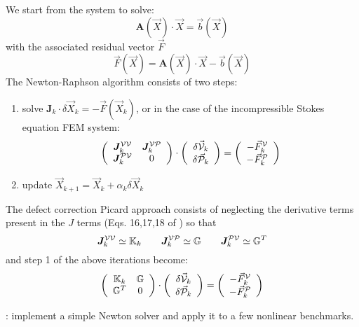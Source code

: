 We start from the system to solve:
\[
{\bm A}(\vec X) \cdot \vec X = \vec b(\vec X)
\]
with the associated residual vector $\vec F$ 
\[
\vec F(\vec X) = {\bm A}(\vec X) \cdot \vec X - \vec b(\vec X)
\]
The Newton-Raphson algorithm consists of two steps:
\begin{enumerate}
\item solve $\bm J_k \cdot \delta \vec X_k = -\vec F(\vec X_k)$, or in the 
case of the incompressible Stokes equation FEM system:
\[
\left(
\begin{array}{cc}
\bm J^{{\cal V}{\cal V}}_k & \bm J^{{\cal V}{\cal P}}_k \\
\bm J^{{\cal P}{\cal V}}_k & 0
\end{array}
\right)
\cdot
\left(
\begin{array}{c}
\delta \vec {\cal V}_k \\ \delta \vec {\cal P}_k
\end{array}
\right)
=
\left(
\begin{array}{c}
- \vec F_k^{\cal V} \\ -\vec F_k^{\cal P}
\end{array}
\right)
\]

\item update $\vec X_{k+1} = \vec X_k + \alpha_k \delta \vec X_k$
\end{enumerate}
The defect correction Picard approach consists of neglecting the derivative terms present 
in the $J$ terms (Eqs. 16,17,18 of \cite{frbt19}) so that 
\[
\bm J^{{\cal V}{\cal V}}_k \simeq {\mathbb{K}}_k 
\quad\quad
\bm J^{{\cal V}{\cal P}}_k \simeq {\mathbb{G}} 
\quad\quad
\bm J^{{\cal P}{\cal V}}_k \simeq {\mathbb{G}}^T
\]
and step 1 of the above iterations become:
\[
\left(
\begin{array}{cc}
{\mathbb{K}}_k & {\mathbb{G}} \\ {\mathbb{G}}^T & 0
\end{array}
\right)
\cdot
\left(
\begin{array}{c}
\delta \vec {\cal V}_k \\ \delta \vec {\cal P}_k
\end{array}
\right)
=
\left(
\begin{array}{c}
- \vec F_k^{\cal V} \\ -\vec F_k^{\cal P}
\end{array}
\right)
\]


\mscthesis: implement a simple Newton solver and apply it to a few nonlinear benchmarks.  
